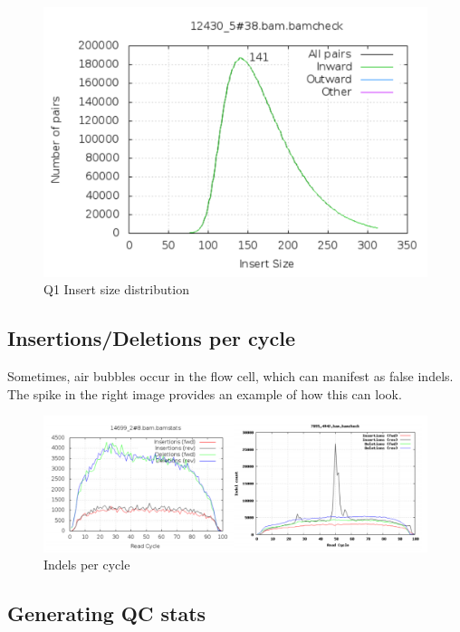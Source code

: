 \documentclass[11pt]{article}
\begin{document}
    \begin{figure}[!h]
\centering
\includegraphics{img/insert_size_quiz.png}
\caption{Q1 Insert size distribution}
\end{figure}

    \hypertarget{insertionsdeletions-per-cycle}{%
\subsection{Insertions/Deletions per
cycle}\label{insertionsdeletions-per-cycle}}

Sometimes, air bubbles occur in the flow cell, which can manifest as
false indels. The spike in the right image provides an example of how
this can look.

    \begin{figure}[!h]
\centering
\includegraphics{img/indels_per_cycle_comparison.png}
\caption{Indels per cycle}
\end{figure}

    \hypertarget{generating-qc-stats}{%
\subsection{Generating QC stats}\label{generating-qc-stats}}
\end{document}
